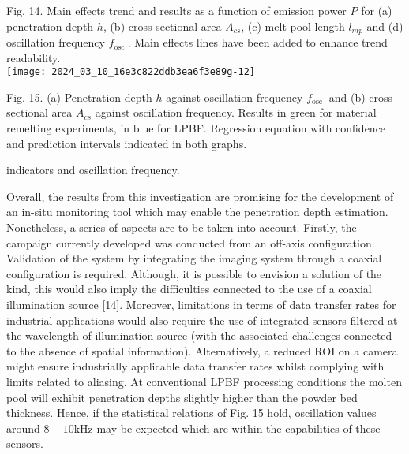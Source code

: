 \documentclass[10pt]{article}
\begin{document}
Fig. 14. Main effects trend and results as a function of emission power $P$ for (a) penetration depth $h$, (b) cross-sectional area $A_{c s}$, (c) melt pool length $l_{m p}$ and (d) oscillation frequency $f_{\text {osc }}$. Main effects lines have been added to enhance trend readability.\\
\texttt{[image: 2024\_03\_10\_16e3c822ddb3ea6f3e89g-12]}

Fig. 15. (a) Penetration depth $h$ against oscillation frequency $f_{\text {osc }}$ and (b) cross-sectional area $A_{c s}$ against oscillation frequency. Results in green for material remelting experiments, in blue for LPBF. Regression equation with confidence and prediction intervals indicated in both graphs.

indicators and oscillation frequency.

Overall, the results from this investigation are promising for the development of an in-situ monitoring tool which may enable the penetration depth estimation. Nonetheless, a series of aspects are to be taken into account. Firstly, the campaign currently developed was conducted from an off-axis configuration. Validation of the system by integrating the imaging system through a coaxial configuration is required. Although, it is possible to envision a solution of the kind, this would also imply the difficulties connected to the use of a coaxial illumination source [14]. Moreover, limitations in terms of data transfer rates for industrial applications would also require the use of integrated sensors filtered at the wavelength of illumination source (with the associated challenges connected to the absence of spatial information). Alternatively, a reduced ROI on a camera might ensure industrially applicable data transfer rates whilst complying with limits related to aliasing. At conventional LPBF processing conditions the molten pool will exhibit penetration depths slightly higher than the powder bed thickness. Hence, if the statistical relations of Fig. 15 hold, oscillation values around $8-10 \mathrm{kHz}$ may be expected which are within the capabilities of these sensors.
\end{document}
